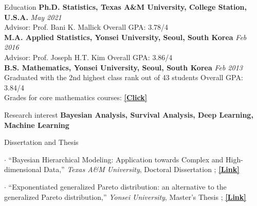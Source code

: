 \documentclass{resume} %
\begin{document}

\begin{rSection}{Education}
{\bf Ph.D. Statistics, Texas A\&M University, College Station, U.S.A.} \hfill {\em May 2021} \\ 
Advisor: Prof. Bani K. Mallick
\hfill {Overall GPA: 3.78/4}\\
{\bf M.A. Applied Statistics, Yonsei University, Seoul, South Korea} \hfill {\em Feb 2016} \\ 
Advisor: Prof. Joseph H.T. Kim
\hfill {Overall GPA: 3.86/4}
\\
{\bf B.S. Mathematics, Yonsei University, Seoul, South Korea} \hfill {\em Feb 2013} \\ 
Graduated with the 2nd highest class rank out of 43 students
\hfill {Overall GPA: 3.84/4}\\
{Grades for core mathematics courses:
\href{https://www.dropbox.com/s/jjjwq3e69xloi96/subjects%28math%29.pdf?dl=0}
{\underline{\textbf{[Click]}}}}
\end{rSection}



\begin{rSection}{Research interest}
\textbf{Bayesian Analysis, Survival Analysis, Deep Learning, Machine Learning}
\end{rSection}


\begin{rSection}{Dissertation and Thesis}
\item[$\cdot$] ``Bayesian Hierarchical Modeling: Application towards Complex and High-dimensional Data,''
\textit{Texas A\&M University}, Doctoral Dissertation
 ;
\href{https://oaktrust.library.tamu.edu/handle/1969.1/195691}{\underline{\textbf{[Link]}}}
\item[$\cdot$] ``Exponentiated generalized Pareto distribution: an alternative to the generalized Pareto distribution,''
\textit{Yonsei University}, Master's Thesis
;
\href{https://library.yonsei.ac.kr/search/detail/CAT000001777455?briefLink=/main/searchBrief?q=Seyoon+lee}{\underline{\textbf{[Link]}}}
\end{rSection}
\end{document}
